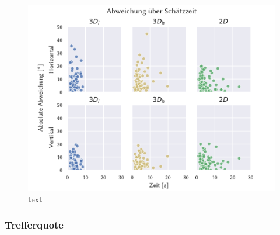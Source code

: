 \begin{figure}
    \centering
    \includegraphics[width=\linewidth]{figures/analysis/pointing_times}
    \caption{text}
    \label{fig:pointing_times}
\end{figure}

\subsubsection*{Trefferquote}

